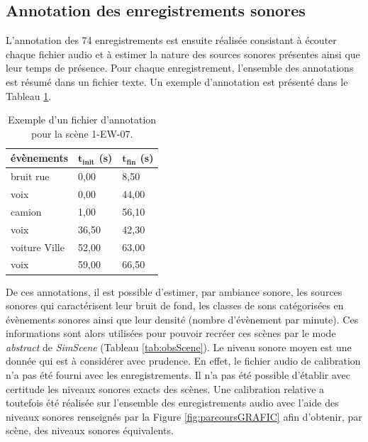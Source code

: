 \subsection{Annotation des enregistrements sonores}\label{part:scene_annotation}

L'annotation des 74 enregistrements est ensuite réalisée consistant à écouter chaque fichier audio et à estimer la nature des sources sonores présentes ainsi que leur temps de présence. Pour chaque enregistrement, l'ensemble des annotations est résumé dans un fichier texte. Un exemple d'annotation est présenté dans le Tableau \ref{tab:exemple_annotation}.\\

\begin{table}[h]
\caption{Exemple d'un fichier d'annotation pour la scène 1-EW-07.}
\centering
\begin{tabular}{lll}
\toprule
\textbf{évènements}    & $\mathbf{t_{init}}$ \textbf{(s)} & $\mathbf{t_{fin}}$ \textbf{(s)} \\ \midrule
bruit rue     & 0,00            & 8,50           \\
\rowcolor[HTML]{C0C0C0}
voix          & 0,00            & 44,00          \\
camion        & 1,00            & 56,10          \\
\rowcolor[HTML]{C0C0C0}
voix          & 36,50           & 42,30          \\
voiture Ville & 52,00          & 63,00          \\
\rowcolor[HTML]{C0C0C0}
voix          & 59,00           & 66,50         \\ \bottomrule
\end{tabular}
\label{tab:exemple_annotation}
\end{table}



De ces annotations, il est possible d'estimer, par ambiance sonore, les sources sonores qui caractérisent leur bruit de fond, les classes de sons catégorisées en évènements sonores ainsi que leur densité (nombre d'évènement par minute). Ces informations sont alors utilisées pour pouvoir recréer ces scènes par le mode \textit{abstract} de \textit{SimScene} (Tableau \ref{tab:obsScene}). Le niveau sonore moyen est une donnée qui est à considérer avec prudence. En effet, le fichier audio de calibration n'a pas été fourni avec les enregistrements. Il n'a pas été possible d'établir avec certitude les niveaux sonores exacts des scènes. Une calibration relative a toutefois été réalisée sur l'ensemble des enregistrements audio avec l'aide des niveaux sonores renseignés par la Figure \ref{fig:parcoursGRAFIC} afin d'obtenir, par scène, des niveaux sonores équivalents.\\

